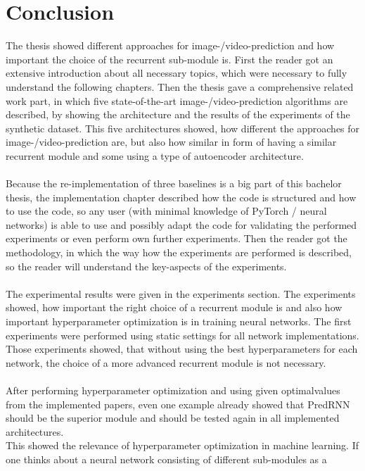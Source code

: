 \section{Conclusion} \label{section::conclusion}
 The thesis showed different approaches for image-/video-prediction and how important the choice of the recurrent sub-module is.
 First the reader got an extensive introduction
 about all necessary topics, which were necessary to fully understand the following chapters. Then the thesis gave a comprehensive related work part, in which
 five state-of-the-art image-/video-prediction algorithms are described, by showing the architecture and the results of the experiments of the synthetic dataset.
 This five architectures showed, how different the approaches for image-/video-prediction are, but also how similar in form of
 having a similar recurrent module and some using a type of autoencoder architecture.
 \\\\
 Because the re-implementation
 of three baselines is a big part of this bachelor thesis, the implementation chapter described how the code is structured and how to use the code, so any
 user (with minimal knowledge of PyTorch / neural networks) is able to use and possibly adapt the code for validating the performed experiments or even perform
 own further experiments. Then the reader got the methodology, in which the way how the experiments are performed is described, so the reader will 
 understand the key-aspects of the experiments.
 \\\\
 The experimental results were given in the experiments section.
 The experiments showed, how important the right choice of a recurrent module is and also how important hyperparameter optimization is in training neural networks.
 The first experiments were performed using static settings for all network implementations. Those experiments showed, that without using the \glqq best\grqq 
 hyperparameters for each network, the choice of a more advanced recurrent module is not necessary.
 \\\\ 
 After performing hyperparameter optimization and using given \glqq optimal\grqq values 
 from the implemented papers, even one example already showed that
 PredRNN should be the superior module and should be tested again in all implemented architectures.\\
 This showed the relevance of hyperparameter optimization in machine learning. If one thinks about a neural network consisting of different sub-modules as a
